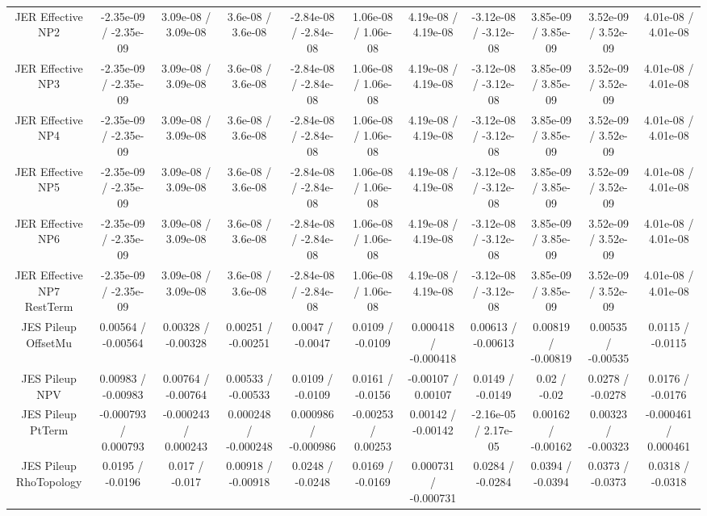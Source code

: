 \begin{table}[htbp]
\begin{center}
\begin{tabular}{|c|c|c|c|c|c|c|c|c|c|c|}
  JER Effective NP2 & -2.35e-09 / -2.35e-09 & 3.09e-08 / 3.09e-08 & 3.6e-08 / 3.6e-08 & -2.84e-08 / -2.84e-08 & 1.06e-08 / 1.06e-08 & 4.19e-08 / 4.19e-08 & -3.12e-08 / -3.12e-08 & 3.85e-09 / 3.85e-09 & 3.52e-09 / 3.52e-09 & 4.01e-08 / 4.01e-08 \\ 
  JER Effective NP3 & -2.35e-09 / -2.35e-09 & 3.09e-08 / 3.09e-08 & 3.6e-08 / 3.6e-08 & -2.84e-08 / -2.84e-08 & 1.06e-08 / 1.06e-08 & 4.19e-08 / 4.19e-08 & -3.12e-08 / -3.12e-08 & 3.85e-09 / 3.85e-09 & 3.52e-09 / 3.52e-09 & 4.01e-08 / 4.01e-08 \\ 
  JER Effective NP4 & -2.35e-09 / -2.35e-09 & 3.09e-08 / 3.09e-08 & 3.6e-08 / 3.6e-08 & -2.84e-08 / -2.84e-08 & 1.06e-08 / 1.06e-08 & 4.19e-08 / 4.19e-08 & -3.12e-08 / -3.12e-08 & 3.85e-09 / 3.85e-09 & 3.52e-09 / 3.52e-09 & 4.01e-08 / 4.01e-08 \\ 
  JER Effective NP5 & -2.35e-09 / -2.35e-09 & 3.09e-08 / 3.09e-08 & 3.6e-08 / 3.6e-08 & -2.84e-08 / -2.84e-08 & 1.06e-08 / 1.06e-08 & 4.19e-08 / 4.19e-08 & -3.12e-08 / -3.12e-08 & 3.85e-09 / 3.85e-09 & 3.52e-09 / 3.52e-09 & 4.01e-08 / 4.01e-08 \\ 
  JER Effective NP6 & -2.35e-09 / -2.35e-09 & 3.09e-08 / 3.09e-08 & 3.6e-08 / 3.6e-08 & -2.84e-08 / -2.84e-08 & 1.06e-08 / 1.06e-08 & 4.19e-08 / 4.19e-08 & -3.12e-08 / -3.12e-08 & 3.85e-09 / 3.85e-09 & 3.52e-09 / 3.52e-09 & 4.01e-08 / 4.01e-08 \\ 
  JER Effective NP7 RestTerm & -2.35e-09 / -2.35e-09 & 3.09e-08 / 3.09e-08 & 3.6e-08 / 3.6e-08 & -2.84e-08 / -2.84e-08 & 1.06e-08 / 1.06e-08 & 4.19e-08 / 4.19e-08 & -3.12e-08 / -3.12e-08 & 3.85e-09 / 3.85e-09 & 3.52e-09 / 3.52e-09 & 4.01e-08 / 4.01e-08 \\ 
  JES Pileup OffsetMu & 0.00564 / -0.00564 & 0.00328 / -0.00328 & 0.00251 / -0.00251 & 0.0047 / -0.0047 & 0.0109 / -0.0109 & 0.000418 / -0.000418 & 0.00613 / -0.00613 & 0.00819 / -0.00819 & 0.00535 / -0.00535 & 0.0115 / -0.0115 \\ 
  JES Pileup NPV & 0.00983 / -0.00983 & 0.00764 / -0.00764 & 0.00533 / -0.00533 & 0.0109 / -0.0109 & 0.0161 / -0.0156 & -0.00107 / 0.00107 & 0.0149 / -0.0149 & 0.02 / -0.02 & 0.0278 / -0.0278 & 0.0176 / -0.0176 \\ 
  JES Pileup PtTerm & -0.000793 / 0.000793 & -0.000243 / 0.000243 & 0.000248 / -0.000248 & 0.000986 / -0.000986 & -0.00253 / 0.00253 & 0.00142 / -0.00142 & -2.16e-05 / 2.17e-05 & 0.00162 / -0.00162 & 0.00323 / -0.00323 & -0.000461 / 0.000461 \\ 
  JES Pileup RhoTopology & 0.0195 / -0.0196 & 0.017 / -0.017 & 0.00918 / -0.00918 & 0.0248 / -0.0248 & 0.0169 / -0.0169 & 0.000731 / -0.000731 & 0.0284 / -0.0284 & 0.0394 / -0.0394 & 0.0373 / -0.0373 & 0.0318 / -0.0318 \\ 

\end{tabular}
\end{center}
\end{table}
